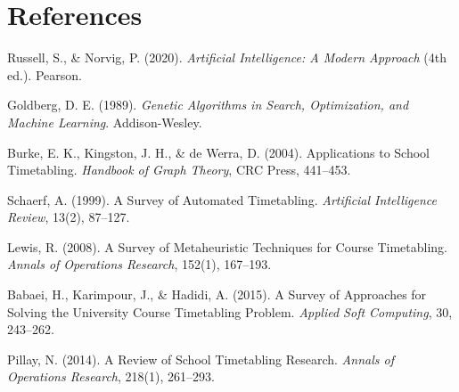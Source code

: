 \documentclass[12pt,a4paper]{report}
\begin{document}
\chapter*{References}

\begin{enumerate}[leftmargin=2.0em, label={[\arabic*]}]
  \item Russell, S., \& Norvig, P. (2020). \textit{Artificial Intelligence: A Modern Approach} (4th ed.). Pearson.
  \item Goldberg, D. E. (1989). \textit{Genetic Algorithms in Search, Optimization, and Machine Learning}. Addison-Wesley.
  \item Burke, E. K., Kingston, J. H., \& de Werra, D. (2004). Applications to School Timetabling. \textit{Handbook of Graph Theory}, CRC Press, 441--453.
  \item Schaerf, A. (1999). A Survey of Automated Timetabling. \textit{Artificial Intelligence Review}, 13(2), 87--127.
  \item Lewis, R. (2008). A Survey of Metaheuristic Techniques for Course Timetabling. \textit{Annals of Operations Research}, 152(1), 167--193.
  \item Babaei, H., Karimpour, J., \& Hadidi, A. (2015). A Survey of Approaches for Solving the University Course Timetabling Problem. \textit{Applied Soft Computing}, 30, 243--262.
  \item Pillay, N. (2014). A Review of School Timetabling Research. \textit{Annals of Operations Research}, 218(1), 261--293.
\end{enumerate}
\end{document}
